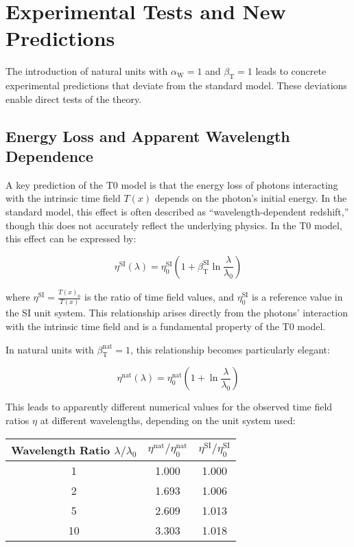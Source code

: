 \documentclass[12pt,a4paper]{article}
\newcommand{\Tfield}{T(x)}
\newcommand{\betaT}{\beta_{\text{T}}}
\newcommand{\alphaW}{\alpha_{\text{W}}}
\begin{document}
	\section{Experimental Tests and New Predictions}
	
	The introduction of natural units with \(\alphaW = 1\) and \(\betaT = 1\) leads to concrete experimental predictions that deviate from the standard model. These deviations enable direct tests of the theory.
	
	\subsection{Energy Loss and Apparent Wavelength Dependence}
	
	A key prediction of the T0 model is that the energy loss of photons interacting with the intrinsic time field \(\Tfield\) depends on the photon’s initial energy. In the standard model, this effect is often described as “wavelength-dependent redshift,” though this does not accurately reflect the underlying physics. In the T0 model, this effect can be expressed by:
	
	\begin{equation}
		\eta^{\text{SI}}(\lambda) = \eta_0^{\text{SI}} \left(1 + \betaT^{\text{SI}} \ln \frac{\lambda}{\lambda_0}\right)
	\end{equation}
	
	where \(\eta^{\text{SI}} = \frac{\Tfield_0}{\Tfield}\) is the ratio of time field values, and \(\eta_0^{\text{SI}}\) is a reference value in the SI unit system. This relationship arises directly from the photons’ interaction with the intrinsic time field and is a fundamental property of the T0 model.
	
	In natural units with \(\betaT^{\text{nat}} = 1\), this relationship becomes particularly elegant:
	
	\begin{equation}
		\eta^{\text{nat}}(\lambda) = \eta_0^{\text{nat}} \left(1 + \ln \frac{\lambda}{\lambda_0}\right)
	\end{equation}
	
	This leads to apparently different numerical values for the observed time field ratios \(\eta\) at different wavelengths, depending on the unit system used:
	
	\begin{center}
		\begin{tabular}{|c|c|c|}
			\hline
			\textbf{Wavelength Ratio \(\lambda/\lambda_0\)} & \textbf{\(\eta^{\text{nat}}/\eta_0^{\text{nat}}\)} & \textbf{\(\eta^{\text{SI}}/\eta_0^{\text{SI}}\)} \\
			\hline
			1 & 1.000 & 1.000 \\
			2 & 1.693 & 1.006 \\
			5 & 2.609 & 1.013 \\
			10 & 3.303 & 1.018 \\
			\hline
		\end{tabular}
	\end{center}
	
\end{document}
